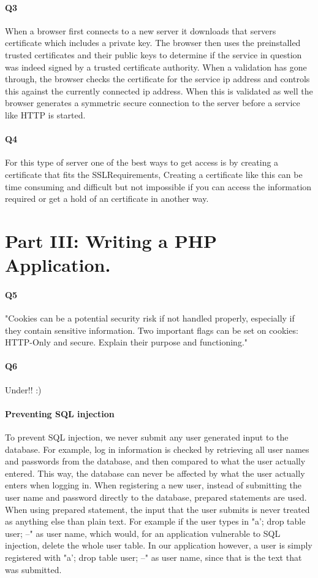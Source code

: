 \documentclass[11pt, a4paper]{article}
\begin{document}
\paragraph{Q3}
When a browser first connects to a new server it downloads that servers certificate which includes a private key. The browser then uses the preinstalled trusted certificates and their public keys to determine if the service in question was indeed signed by a trusted certificate authority. When a validation has gone through, the browser checks the certificate for the service ip address and controls this against the currently connected ip address. When this is validated as well the browser generates a symmetric secure connection to the server before a service like HTTP is started. 
\paragraph{Q4}
For this type of server one of the best ways to get access is by creating a certificate that fits the SSLRequirements, Creating a certificate like this can be time consuming and difficult but not impossible if you can access the information required or get a hold of an certificate in another way.
\section{Part III: Writing a PHP Application.}
\paragraph{Q5}
"Cookies can be a potential security risk if not handled properly, especially if they contain
sensitive information. Two important flags can be set on cookies: HTTP-Only and secure.
Explain their purpose and functioning."
\paragraph{Q6} Under!! :)
\paragraph{Preventing SQL injection}
To prevent SQL injection, we never submit any user generated input to the database. For example, log in information is checked by retrieving all user names and passwords from the database, and then compared to what the user actually entered. This way, the database can never be affected by what the user actually enters when logging in.
When registering a new user, instead of submitting the user name and password directly to the database, prepared statements are used. When using prepared statement, the input that the user submits is never treated as anything else than plain text. For example if the user types in "a'; drop table user; --" as user name, which would, for an application vulnerable to SQL injection, delete the whole user table. In our application however, a user is simply registered with "a'; drop table user; --" as user name, since that is the text that was submitted.
\end{document}
